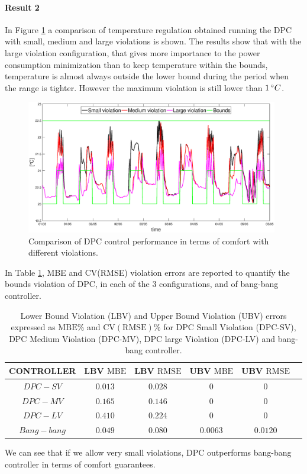 \paragraph{Result 2} In Figure \ref{F:comparison_all_temperature} a comparison of temperature regulation obtained running the DPC with small, medium and large violations is shown. The results show that with the large violation configuration, that gives more importance to the power consumption minimization than to keep temperature within the bounds, temperature is almost always outside the lower bound during the period when the range is tighter. However the maximum violation is still lower than $1\,\degree C$.
\begin{figure}[h!]
	\begin{center}
		\includegraphics[width=26pc]{figures/Temperatures_all.eps}
	\end{center}
	\caption{Comparison of DPC control performance in terms of comfort with different violations.}
	\label{F:comparison_all_temperature}
\end{figure}
In Table \ref{T:violationErrors}, MBE and CV(RMSE) violation errors are reported to quantify the bounds violation of DPC, in each of the $3$ configurations, and of bang-bang controller.
\begin{table}[h!]
	\centering
		\begin{tabular}{cccccc}
			\toprule
			CONTROLLER  & LBV $\mathrm{MBE}$  & LBV $\mathrm{RMSE}$ & UBV $\mathrm{MBE}$ & UBV $\mathrm{RMSE}$ 	\\ 
			\midrule
			$DPC-SV$    & $0.013$             & $0.028$  			      & $0$    				 & $0$     	  	\\
			$DPC-MV$    & $0.165$ 			  & $0.146$     			  & $0$    				 & $0$		  	\\
			$DPC-LV$    & $0.410$  			  & $0.224$     			  & $0$    				 & $0$	      	\\
			$Bang-bang$ & $0.049$ 			  & $0.080$    				  & $0.0063$ 		     & $0.0120$	  	\\
			\bottomrule
		\end{tabular}
	\caption{Lower Bound Violation (LBV) and Upper Bound Violation (UBV) errors expressed as $\mathrm{MBE}\%$ and $\mathrm{CV(RMSE)}\%$ for DPC Small Violation (DPC-SV), DPC Medium Violation (DPC-MV), DPC large Violation (DPC-LV) and bang-bang controller.}
	\captionsetup{justification=centering}
	\label{T:violationErrors}
\end{table}
We can see that if we allow very small violations, DPC outperforms bang-bang controller in terms of comfort guarantees.

